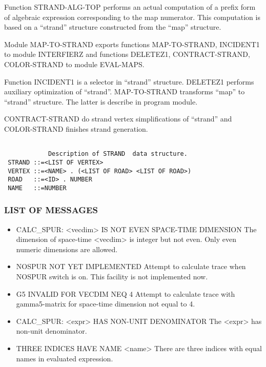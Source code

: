 Function STRAND-ALG-TOP performs an actual computation of a prefix
form of algebraic expression corresponding to the map numerator. This
computation is based on a ``strand'' structure constructed from the
``map'' structure.

Module MAP-TO-STRAND exports functions MAP-TO-STRAND, INCIDENT1 to
module INTERFIERZ and functions DELETEZ1, CONTRACT-STRAND,
COLOR-STRAND to module EVAL-MAPS.

Function INCIDENT1 is a selector in ``strand'' structure.  DELETEZ1
performs auxiliary optimization of ``strand''.  MAP-TO-STRAND transforms
``map'' to ``strand'' structure.  The latter is describe in program
module.

CONTRACT-STRAND do strand vertex simplifications of ``strand'' and
COLOR-STRAND finishes strand generation.

\begin{verbatim}

            Description of STRAND  data structure.
 STRAND ::=<LIST OF VERTEX>
 VERTEX ::=<NAME> . (<LIST OF ROAD> <LIST OF ROAD>)
 ROAD   ::=<ID> . NUMBER
 NAME   ::=NUMBER
\end{verbatim}


\subsubsection*{LIST OF MESSAGES}

\begin{itemize}

\item{CALC\_SPUR: \textless{}vecdim\textgreater{} IS NOT EVEN SPACE-TIME DIMENSION}
 The dimension of space-time \textless{}vecdim\textgreater{} is integer but not
even. Only even numeric dimensions are allowed.

\item{NOSPUR NOT YET IMPLEMENTED}
 Attempt to calculate trace when NOSPUR switch is on.  This facility
is not implemented now.

\item{G5 INVALID FOR VECDIM NEQ 4}
 Attempt to calculate trace with gamma5-matrix for space-time
dimension not equal to 4.

\item{CALC\_SPUR: \textless{}expr\textgreater{} HAS NON-UNIT DENOMINATOR}
The <expr> has non-unit denominator.

\item{THREE INDICES HAVE NAME \textless{}name\textgreater{}}
 There are three indices with equal names in evaluated expression.

\end{itemize}

